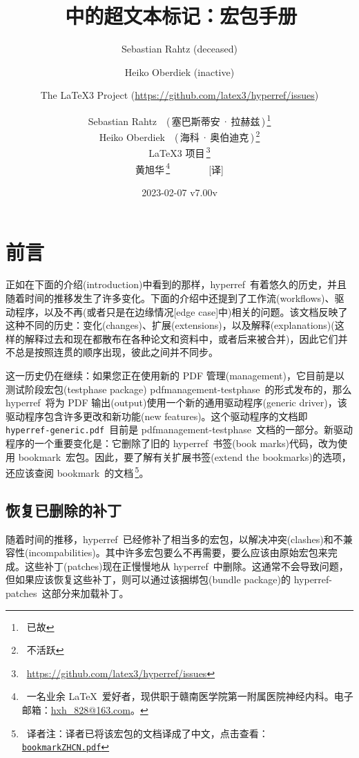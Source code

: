\documentclass{article}
\author{Sebastian Rahtz (deceased)\and
       Heiko Oberdiek (inactive)\and
       The \LaTeX3 Project (\url{https://github.com/latex3/hyperref/issues})}
\author{Sebastian Rahtz~~(\,塞巴斯蒂安\,·\,拉赫兹\,)\,\thanks{\ 已故} \\[4pt]
       Heiko Oberdiek~~(\,海科\,·\,奥伯迪克\,)\,\thanks{\ 不活跃} \\[4pt]
       \LaTeX3 项目\,\thanks{\ \url{https://github.com/latex3/hyperref/issues}}\\[2.0em]
       黄旭华\,\thanks{\ 一名业余 \LaTeX\ 爱好者，现供职于赣南医学院第一附属医院神经内科。电子邮箱：\href{mailto:hxh\_828@163.com}{hxh\_828@163.com}。}\ \ \ \ \ \ \ \ [译]\vspace{2.0em}}
\title{{\huge \hologo{LaTeX}\,{\huge \Heiti 中的超文本标记}：{\Huge \xpackage{hyperref}}{\huge \Heiti 宏包手册}}\vspace{2.0em}}
\date{2023-02-07 v7.00v}
\newcommand*{\xpackage}[1]{\textsf{#1}}
\begin{document}
\pagestyle{plain} %
\maketitle
\thispagestyle{empty} %
\newpage
\tableofcontents
\setcounter{tocdepth}{2}%

\section{\heiti 前言}
正如在下面的介绍(introduction)中看到的那样，\xpackage{hyperref}\ 有着悠久的历史，并且随着时间的推移发生了许多变化。下面的介绍中还提到了工作流(workflows)、驱动程序，以及不再(或者只是在边缘情况[edge case]中)相关的问题。该文档反映了这种不同的历史：变化(changes)、扩展(extensions)，以及解释(explanations)(这样的解释过去和现在都散布在各种论文和资料中，或者后来被合并)，因此它们并不总是按照连贯的顺序出现，彼此之间并不同步。

这一历史仍在继续：如果您正在使用新的  PDF 管理(management)，它目前是以测试阶段宏包(testphase package) \xpackage{pdfmanagement-testphase}\ 的形式发布的，那么 \xpackage{hyperref}\ 将为 PDF 输出(output)使用一个新的通用驱动程序(generic driver)，该驱动程序包含许多更改和新功能(new features)。这个驱动程序的文档即 \texttt{hyperref-generic.pdf}\ 目前是 \xpackage{pdfmanagement-testphase}\ 文档的一部分。新驱动程序的一个重要变化是：它删除了旧的 \xpackage{hyperref}\ 书签(book marks)代码，改为使用 \xpackage{bookmark}\ 宏包。因此，要了解有关扩展书签(extend the bookmarks)的选项，还应该查阅 \xpackage{bookmark}\ 的文档\,\footnote{\ 译者注：译者已将该宏包的文档译成了中文，点击查看：\href{run:bookmark_ZH_CN.pdf}{\texttt{bookmark\raisebox{-0.7mm}{\,-\,}ZH\raisebox{-0.7mm}{\,-}CN.pdf}}}。

\subsection[恢复已删除的补丁]{\heiti 恢复已删除的补丁}


随着时间的推移，\xpackage{hyperref}\ 已经修补了相当多的宏包，以解决冲突(clashes)和不兼容性(incompabilities)。其中许多宏包要么不再需要，要么应该由原始宏包来完成。这些补丁(patches)现在正慢慢地从 \xpackage{hyperref}\ 中删除。这通常不会导致问题，但如果应该恢复这些补丁，则可以通过该捆绑包(bundle package)的 \xpackage{hyperref-patches}\ 这部分来加载补丁。


\newpage
\end{document}
